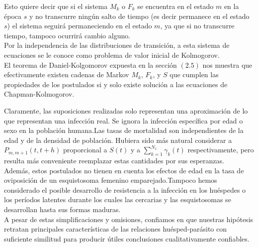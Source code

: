 Esto quiere decir que si el sistema $M_k$ o $F_k$ se encuentra en el estado $m$ en la época $s$ y no transcurre ningún salto de tiempo (es decir permanece en el estado $s$) el sistema seguirá permaneciendo en el estado $m$, ya que si no transcurre tiempo, tampoco ocurrirá cambio alguno.\\
Por la independencia de las distribuciones de transición, a esta sistema de ecuaciones se le conoce como problema de valor inicial de Kolmogorov.\\ El teorema de Daniel-Kolgomorov expuesta en la sección $(2.5)$ nos muestra que efectivamente existen cadenas de Markov $M_k$, $F_k$, y $S$ que cumplen las propiedades de los postulados si y solo existe solución a las ecuaciones de Chapman-Kolmogorov.\\
\begin{Obs}
    Claramente, las suposiciones realizadas solo representan una aproximación de lo que representan una infección real. Se ignora la infección específica por edad o sexo en la población humana.Las tasas de mortalidad son independientes de la edad y de la densidad de población. Hubiera sido más natural considerar a $P_{m,m+1}(t,t+h)$ 
    proporcional a $S(t)$ y a $\sum_{k=1}^{N_1}\gamma_k(t)$ respectivamente, pero resulta más conveniente reemplazar estas cantidades por sus esperanzas.\\
    Además, estos postulados no tienen en cuenta los efectos de edad en la tasa de oviposición de un esquistosoma femenino emparejado.Tampoco hemos considerado el posible desarrollo de resistencia a la infección en los huéspedes o los períodos latentes durante los cuales las cercarias y las esquistosomas se desarrollan hasta sus formas maduras.\\A pesar de estas simplificaciones y omisiones, confiamos en que nuestras hipótesis retratan principales
    características de las relaciones huésped-parásito con suficiente similitud para producir útiles conclusiones cualitativamente confiables.
\end{Obs}